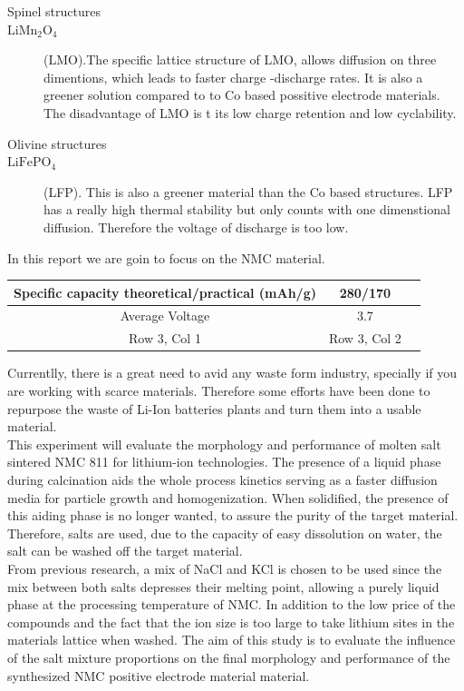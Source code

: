 \documentclass{article}
\begin{document}
\begin{description}
  \item[Spinel structures] 
  \item[$\text{LiMn}_{2}\text{O}_{4}$](LMO).The specific lattice structure
  of LMO, allows diffusion on three dimentions, which leads to faster charge
  -discharge rates. It is also a greener solution compared to to 
  Co based possitive electrode materials. The disadvantage of LMO is t
its low charge retention and low cyclability.
\end{description}

\begin{description}
  \item[Olivine structures] 
  \item[$\text{LiFePO}_{4}$](LFP). This is also a greener material than the 
  Co based structures. LFP has a really high thermal stability but only counts
  with one dimenstional diffusion. Therefore the voltage of discharge
  is too low. 
\end{description}

In this report we are goin to focus on the NMC material.\\
\begin{center}
  

\begin{tabular}{|c|c|c|}
  
  \hline
  Specific capacity
theoretical/practical
(mAh/g) & 280/170  \\
  \hline
  Average Voltage & 3.7  \\
  \hline
  Row 3, Col 1 & Row 3, Col 2 \\
  \hline
\end{tabular}
\end{center}
Currentlly, there is a great need to avid any waste form industry,
specially if you are working with scarce materials. Therefore some efforts
have been done to repurpose the waste of Li-Ion batteries plants and turn them into a
usable material.\\
This experiment will evaluate the morphology and performance of molten salt sintered NMC 811 for lithium-ion technologies. The presence of a liquid phase during calcination aids the whole process kinetics serving as a faster diffusion media for particle growth and homogenization. When solidified, the presence of this aiding phase is no longer wanted, to assure the purity of the target material.  Therefore, salts are used, due to the capacity of easy dissolution on water, the salt can be washed off the target material. \cite{knuth1984}\\
From previous research, a mix of NaCl and KCl is chosen to be used since the mix between both salts depresses their melting point, allowing a purely liquid phase at the processing temperature of NMC. In addition to the low price of the compounds and the fact that the ion size is too large to take lithium sites in the materials lattice when washed. The aim of this study is to evaluate the influence of the salt mixture proportions on the final morphology and performance of the synthesized NMC positive electrode material material.
\end{document}
